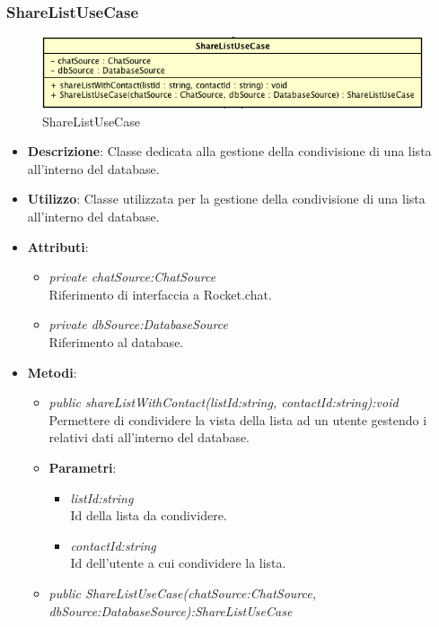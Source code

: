 \subsubsection{ShareListUseCase}

\label{ShareListUseCase}
\begin{figure}[ht]
	\centering
	\includegraphics[scale=0.5]{Sezioni/SottosezioniST/img/app/ShareListUseCase.png}
	\caption{ShareListUseCase}
\end{figure}

\begin{itemize}
\item \textbf{Descrizione}: Classe dedicata alla gestione della condivisione di una lista all'interno del database.
\item \textbf{Utilizzo}: Classe utilizzata per la gestione della condivisione di una lista all'interno del database.
\item \textbf{Attributi}: 
\begin{itemize}
\item \textit{private chatSource:ChatSource}\\
	Riferimento di interfaccia a Rocket.chat.
\item \textit{private dbSource:DatabaseSource}\\
	Riferimento al database.
\end{itemize}
\item \textbf{Metodi}:
\begin{itemize}
\item \textit{public shareListWithContact(listId:string, contactId:string):void}\\
	Permettere di condividere la vista della lista ad un utente gestendo i relativi dati all'interno del database.
	\item{\textbf{Parametri}: \begin{itemize}
	\item \textit{listId:string}\\
	Id della lista da condividere.
	\item \textit{contactId:string}\\
	Id dell'utente a cui condividere la lista.
	\end{itemize}}
\item \textit{public ShareListUseCase(chatSource:ChatSource, dbSource:DatabaseSource):ShareListUseCase}\\

\end{itemize}
\end{itemize}
